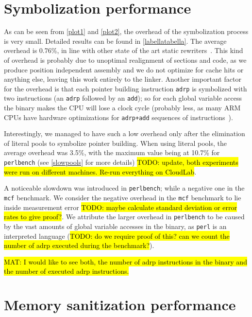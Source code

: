 \documentclass[a4paper,11pt,oneside]{report}
\DeclareRobustCommand{\todo}[1]{{\sethlcolor{cyan}\hl{TODO: #1}}}
\DeclareRobustCommand{\mat}[1]{{\sethlcolor{red}\hl{MAT: #1}}}
\begin{document}
\section{Symbolization performance}

As can be seen from \autoref{plot1} and \autoref{plot2}, the overhead of the
symbolization process is very small. Detailed results can be found in
\autoref{labellatabella}.  The average overhead is 0.76\%, in line with other
state of the art static rewriters~\cite{egalito}.  This kind of overhead is
probably due to unoptimal realignment of sections and code, as we produce
position independent assembly and we do not optimize for cache hits or anything
else, leaving this work entirely to the linker. Another important
factor for the overhead is that each pointer building instruction \texttt{adrp}
is symbolized with two instructions (an \texttt{adrp} followed by an
\texttt{add}); so for each global variable access the binary makes the CPU will
lose a clock cycle (probably less, as many ARM CPUs have hardware optimizations
for \texttt{adrp+add} sequences of instructions~\cite{pointeroptimizations}).

Interestingly, we managed to have such a low overhead only after the
elimination of literal pools to symbolize pointer building. When using literal
pools, the average overhead was 3.5\%, with the maximum value being at 10.7\%
for \texttt{perlbench} (see \autoref{slowpools} for more details) \todo{update, both experiments were run on different machines. Re-run
everything on CloudLab}. 

A noticeable slowdown was introduced in \texttt{perlbench}; while a negative
one in the \texttt{mcf} benchmark. We consider the negative overhead in the
\texttt{mcf} benchmark to lie inside measurement error \todo{maybe calculate
standard deviation or error rates to give proof?}. We attribute the larger
overhead in \texttt{perlbench} to be caused by the vast amounts of global
variable accesses in the binary, as \texttt{perl} is an interpreted language
(\todo{do we require proof of this?  can we count the number of adrp executed
during the benchmark?}).

\mat{I would like to see both, the number of adrp instructions in the binary and the number of executed adrp instructions.}

\section{Memory sanitization performance}
\end{document}

